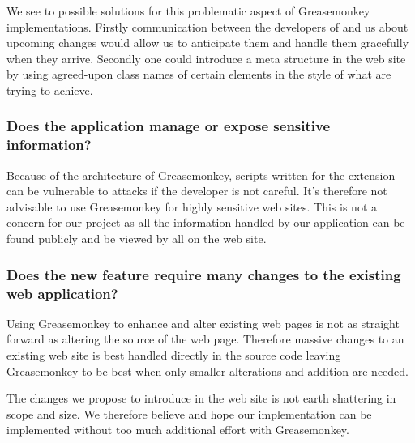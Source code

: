 We see to possible solutions for this problematic aspect of Greasemonkey
implementations. Firstly communication between the developers of
\urort{} and us about upcoming changes would allow us to anticipate
them and handle them gracefully when they arrive. Secondly one could
introduce a meta structure in the web site by using agreed-upon
class names of certain  elements in the style of
what %
are trying to achieve.

\subsubsection{Does the application manage or expose sensitive information?}

Because of the architecture of Greasemonkey, scripts written for the extension
can be vulnerable to attacks if the developer is not careful. It's
therefore not advisable to use Greasemonkey for highly sensitive web sites.
This is not a concern for our project as all the information handled by our
application can be found publicly and be viewed by all on the \urort{}
web site.

\subsubsection{Does the new feature require many changes to the existing web
  application?}

Using Greasemonkey to enhance and alter existing web pages is not as straight
forward as altering the source of the web page. Therefore massive changes to
an existing web site is best handled directly in the source code leaving
Greasemonkey to be best when only smaller alterations and addition are needed.

The changes we propose to introduce in the \urort{} web site is not earth
shattering in scope and size. We therefore believe and hope our implementation
can be implemented without too much additional effort with Greasemonkey.

